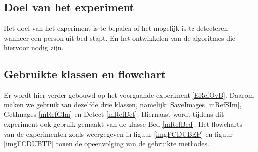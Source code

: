 \subsection{Doel van het experiment}
\label{ERefDBD}
Het doel van het experiment is te bepalen of het mogelijk is te detecteren wanneer een person uit bed stapt. En het ontwikkelen van de algoritmes die hiervoor nodig zijn. 

\subsection{Gebruikte klassen en flowchart}
\label{ERefDBK}
Er wordt hier verder gebouwd op het voorgaande experiment \ref{ERefOvB}. Daarom maken we gebruik van dezelfde drie klassen, namelijk: SaveImages \ref{mRefSIm}, GetImages \ref{mRefGIm} en Detect \ref{mRefDet}. Hiernaast wordt tijdens dit experiment ook gebruik gemaakt van de klasse Bed \ref{mRefBed}. Het flowcharts van de experimenten zoals weergegeven in figuur \ref{imgFCDUBEP} en figuur \ref{imgFCDUBTP} tonen de opeenvolging van de gebruikte methodes.

